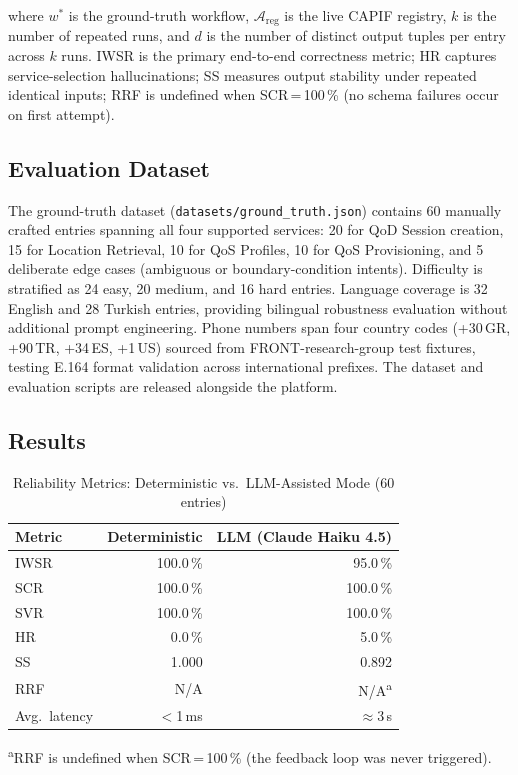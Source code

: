 \documentclass[conference]{IEEEtran}
\begin{document}
where $w^*$ is the ground-truth workflow, $\mathcal{A}_{\text{reg}}$
is the live CAPIF registry, $k$ is the number of repeated runs,
and $d$ is the number of distinct output tuples per entry across $k$ runs.
IWSR is the primary end-to-end correctness metric; HR captures
service-selection hallucinations; SS measures output stability
under repeated identical inputs; RRF is undefined when SCR\,=\,100\,\%
(no schema failures occur on first attempt).

\subsection{Evaluation Dataset}

The ground-truth dataset (\texttt{datasets/ground\_truth.json}) contains
60 manually crafted entries spanning all four supported services:
20 for QoD Session creation, 15 for Location Retrieval,
10 for QoS Profiles, 10 for QoS Provisioning,
and 5 deliberate edge cases (ambiguous or boundary-condition intents).
Difficulty is stratified as 24 easy, 20 medium, and 16 hard entries.
Language coverage is 32 English and 28 Turkish entries, providing
bilingual robustness evaluation without additional prompt engineering.
Phone numbers span four country codes (+30\,GR, +90\,TR, +34\,ES, +1\,US)
sourced from FRONT-research-group test fixtures, testing E.164 format
validation across international prefixes.
The dataset and evaluation scripts are released alongside the platform.

\subsection{Results}

\begin{table}[t]
\centering
\caption{Reliability Metrics: Deterministic vs.\ LLM-Assisted Mode (60 entries)}
\label{tab:results}
\small
\begin{tabular}{lrr}
\toprule
\textbf{Metric} & \textbf{Deterministic} & \textbf{LLM (Claude Haiku 4.5)} \\
\midrule
IWSR  & 100.0\,\% &  95.0\,\% \\
SCR   & 100.0\,\% & 100.0\,\% \\
SVR   & 100.0\,\% & 100.0\,\% \\
HR    &   0.0\,\% &   5.0\,\% \\
SS    &    1.000  &    0.892  \\
RRF   &    N/A    &    N/A\textsuperscript{a} \\
Avg.\ latency & $<$1\,ms & $\approx$3\,s \\
\bottomrule
\end{tabular}
\vspace{2pt}

\noindent\footnotesize\textsuperscript{a}RRF is undefined when
SCR\,=\,100\,\% (the feedback loop was never triggered).
\end{table}
\end{document}
